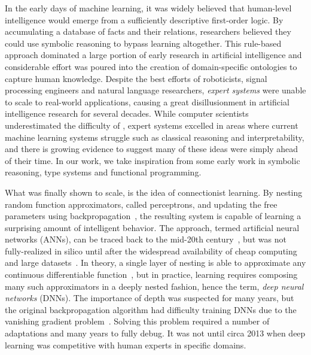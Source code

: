 In the early days of machine learning, it was widely believed that human-level intelligence would emerge from a sufficiently descriptive first-order logic. By accumulating a database of facts and their relations, researchers believed they could use symbolic reasoning to bypass learning altogether. This rule-based approach dominated a large portion of early research in artificial intelligence and considerable effort was poured into the creation of domain-specific ontologies to capture human knowledge. Despite the best efforts of roboticists, signal processing engineers and natural language researchers, \textit{expert systems} were unable to scale to real-world applications, causing a great disillusionment in artificial intelligence research for several decades. While computer scientists underestimated the difficulty of , expert systems excelled in areas where current machine learning systems struggle such as classical reasoning and interpretability, and there is growing evidence to suggest many of these ideas were simply ahead of their time. In our work, we take inspiration from some early work in symbolic reasoning, type systems and functional programming.

What was finally shown to scale, is the idea of connectionist learning. By nesting random function approximators, called perceptrons, and updating the free parameters using backpropagation~\citep{werbos1990backpropagation, rumelhart1988learning}, the resulting system is capable of learning a surprising amount of intelligent behavior. The approach, termed artificial neural networks (ANNs), can be traced back to the mid-20th century~\citep{ivakhnenko1965cybernetic, rosenblatt1958perceptron}, but was not fully-realized in silico until after the widespread availability of cheap computing and large datasets~\citep{lecun2015deep}. In theory, a single layer of nesting is able to approximate any continuous differentiable function~\citep{hornik1989multilayer}, but in practice, learning requires composing many such approximators in a deeply nested fashion, hence the term, \textit{deep neural networks} (DNNs). The importance of depth was suspected for many years, but the original backpropagation algorithm had difficulty training DNNs due to the vanishing gradient problem~\citep{bengio1994learning}. Solving this problem required a number of adaptations and many years to fully debug. It was not until circa 2013 when deep learning was competitive with human experts in specific domains.

